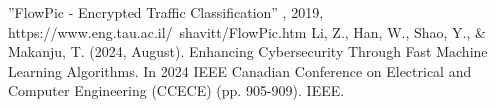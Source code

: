 \documentclass[conference]{IEEEtran}
\begin{document}
\begin{thebibliography}{00}
 ”FlowPic - Encrypted Traffic Classification” , 2019, https://www.eng.tau.ac.il/~shavitt/FlowPic.htm
 Li, Z., Han, W., Shao, Y., \& Makanju, T. (2024, August). Enhancing Cybersecurity Through Fast Machine Learning Algorithms. In 2024 IEEE Canadian Conference on Electrical and Computer Engineering (CCECE) (pp. 905-909). IEEE.


\end{thebibliography}
\end{document}
